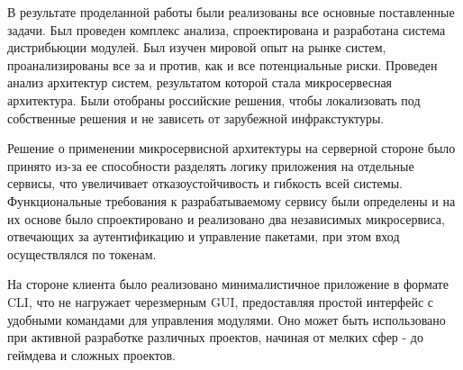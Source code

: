 \Conclusion %

В результате проделанной работы были реализованы все основные поставленные задачи. Был проведен комплекс анализа, спроектирована и разработана система дистрибьюции модулей. Был изучен мировой опыт на рынке систем, проанализированы все за и против, как и все потенциальные риски. Проведен анализ архитектур систем, результатом которой стала микросервесная архитектура. Были отобраны российские решения, чтобы локализовать под собственные решения и не зависеть от зарубежной инфракстуктуры. 

Решение о применении микросервисной архитектуры на серверной стороне было принято из-за ее способности разделять логику приложения на отдельные сервисы, что увеличивает отказоустойчивость и гибкость всей системы. Функциональные требования к разрабатываемому сервису были определены и на их основе было спроектировано и реализовано два независимых микросервиса, отвечающих за аутентификацию и управление пакетами, при этом вход осуществлялся по токенам. 

На стороне клиента было реализовано минималистичное приложение в формате CLI, что не нагружает черезмерным GUI, предоставляя простой интерфейс с удобными командами для управления модулями. Оно может быть использовано при активной разработке различных проектов, начиная от мелких сфер - до геймдева и сложных проектов.



